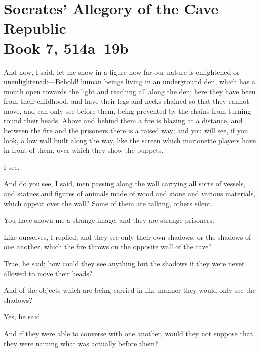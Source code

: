 
\author{Plato}
\chapter[Plato -- Socrates' Allegory of the Cave]{Socrates' Allegory
of the Cave\\\smaller Republic\\\smaller Book 7, 514a--19b}



And now, I said, let me show in a figure how far our nature is
enlightened or un\-en\-light\-ened:---Behold! human beings living in
an underground den, which has a mouth open towards the light and
reaching all along the den; here they have been from their childhood,
and have their legs and necks chained so that they cannot move, and
can only see before them, being prevented by the chains from turning
round their heads. Above and behind them a fire is blazing at a
distance, and between the fire and the prisoners there is a raised
way; and you will see, if you look, a low wall built along the way,
like the screen which marionette players have in front of them, over
which they show the puppets.

I see.

And do you see, I said, men passing along the wall carrying all sorts
of vessels, and statues and figures of animals made of wood and stone
and various materials, which appear over the wall? Some of them are
talking, others silent.

You have shown me a strange image, and they are strange prisoners.

Like ourselves, I replied; and they see only their own shadows, or the
shadows of one another, which the fire throws on the opposite wall of
the cave?

True, he said; how could they see anything but the shadows if they
were never allowed to move their heads?

And of the objects which are being carried in like manner they would
only see the shadows?

Yes, he said.

And if they were able to converse with one another, would they not
suppose that they were naming what was actually before them?

